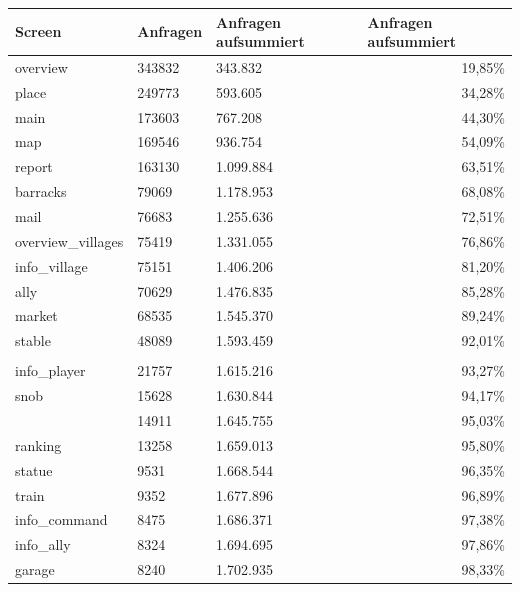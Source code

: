 \documentclass[10pt]{scrartcl}
\begin{document}
  \begin{table}
    \centering
   \begin{tabular}{|l|l|l|r|}
      \hline
      \textbf{Screen} & \multicolumn{1}{l|}{\textbf{Anfragen}} & \multicolumn{1}{l|}{\textbf{Anfragen aufsummiert}} & \multicolumn{1}{l|}{\textbf{Anfragen aufsummiert}} \\ \hline
  
   overview        & 343832 & 343.832 & 19,85\% \\ \hline
   place              & 249773 & 593.605 & 34,28\% \\ \hline
   main               & 173603 & 767.208 & 44,30\% \\ \hline
   map                & 169546 & 936.754 & 54,09\% \\ \hline
   report             & 163130 & 1.099.884 & 63,51\% \\ \hline
   barracks           & 79069 & 1.178.953 & 68,08\% \\ \hline
   mail               & 76683 & 1.255.636 & 72,51\% \\ \hline
   overview\_villages  & 75419 & 1.331.055 & 76,86\% \\ \hline
   info\_village       & 75151 & 1.406.206 & 81,20\% \\ \hline
   ally               & 70629 & 1.476.835 & 85,28\% \\ \hline
   market             & 68535 & 1.545.370 & 89,24\% \\ \hline
   stable             & 48089 & 1.593.459 & 92,01\% \\ \hline
   & \multicolumn{1}{l|}{} & \multicolumn{1}{l|}{} & \multicolumn{1}{l|}{} \\ \hline
   info\_player        & 21757 & 1.615.216 & 93,27\% \\ \hline
   snob               & 15628 & 1.630.844 & 94,17\% \\ \hline
                      & 14911 & 1.645.755 & 95,03\% \\ \hline
   ranking            & 13258 & 1.659.013 & 95,80\% \\ \hline
   statue             & 9531 & 1.668.544 & 96,35\% \\ \hline
   train              & 9352 & 1.677.896 & 96,89\% \\ \hline
   info\_command       & 8475 & 1.686.371 & 97,38\% \\ \hline
   info\_ally          & 8324 & 1.694.695 & 97,86\% \\ \hline
   garage             & 8240 & 1.702.935 & 98,33\% \\ \hline

\end{tabular}
\end{table}
\end{document}
